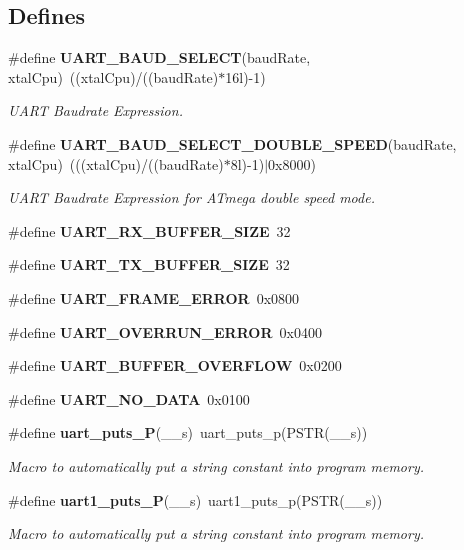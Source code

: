 \subsection*{Defines}
\begin{CompactItemize}
\item 
\#define {\bf UART\_\-BAUD\_\-SELECT}(baud\-Rate, xtal\-Cpu)~((xtal\-Cpu)/((baud\-Rate)$\ast$16l)-1)
\begin{CompactList}\small\item\em UART Baudrate Expression. \item\end{CompactList}\item 
\#define {\bf UART\_\-BAUD\_\-SELECT\_\-DOUBLE\_\-SPEED}(baud\-Rate, xtal\-Cpu)~(((xtal\-Cpu)/((baud\-Rate)$\ast$8l)-1)$|$0x8000)
\begin{CompactList}\small\item\em UART Baudrate Expression for ATmega double speed mode. \item\end{CompactList}\item 
\#define {\bf UART\_\-RX\_\-BUFFER\_\-SIZE}~32
\item 
\#define {\bf UART\_\-TX\_\-BUFFER\_\-SIZE}~32
\item 
\#define {\bf UART\_\-FRAME\_\-ERROR}~0x0800
\item 
\#define {\bf UART\_\-OVERRUN\_\-ERROR}~0x0400
\item 
\#define {\bf UART\_\-BUFFER\_\-OVERFLOW}~0x0200
\item 
\#define {\bf UART\_\-NO\_\-DATA}~0x0100
\item 
\#define {\bf uart\_\-puts\_\-P}(\_\-\_\-s)~uart\_\-puts\_\-p(PSTR(\_\-\_\-s))
\begin{CompactList}\small\item\em Macro to automatically put a string constant into program memory. \item\end{CompactList}\item 
\#define {\bf uart1\_\-puts\_\-P}(\_\-\_\-s)~uart1\_\-puts\_\-p(PSTR(\_\-\_\-s))
\begin{CompactList}\small\item\em Macro to automatically put a string constant into program memory. \item\end{CompactList}\end{CompactItemize}
